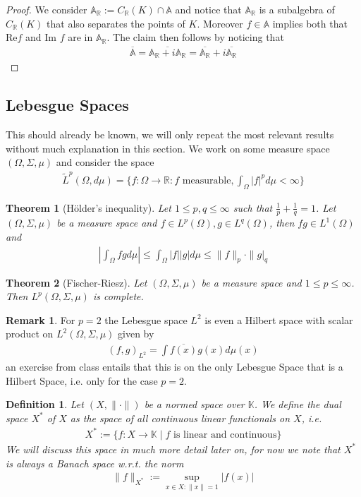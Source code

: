 \documentclass[11pt,a4paper]{article}
\newtheorem{thm}{Theorem}[section]
\newtheorem{defn}{Definition}[section]
\theoremstyle{definition}
\newtheorem{rem}{Remark}[section]
\begin{document}
\begin{proof}
We consider $\mathbb{A}_\mathbb{R}:= C_\mathbb{R}(K) \cap \mathbb{A}$ and notice that $\mathbb{A}_\mathbb{R}$ is a subalgebra of $C_\mathbb{R}(K)$ that also separates the points of $K$. Moreover $f \in \mathbb{A}$ implies both that Re$f$ and  Im $f$ are in $\mathbb{A}_\mathbb{R}$. The claim then follows by noticing that
\begin{align*}
\overline{\mathbb{A}}= \overline{\mathbb{A}_\mathbb{R} + i \mathbb{A}_\mathbb{R}} = \overline{\mathbb{A}_\mathbb{R}}+ i \overline{\mathbb{A}_\mathbb{R}}
\end{align*}
\end{proof}
\newpage 
\subsection{Lebesgue Spaces}
This should already be known, we will only repeat the most relevant results without much explanation in this section. We work on some measure space $(\Omega, \Sigma, \mu)$ and consider the space 
\begin{align*}
\tilde{L}^p( \Omega, d \mu)= \lbrace f: \Omega \to \mathbb{R} : f \text{ measurable}, \int_\Omega |f|^p d \mu < \infty \rbrace 
\end{align*}
\begin{thm}[Hölder's inequality] Let $1 \leq p,q \leq \infty$ such that $\frac{1}{p} + \frac{1}{q}=1$. Let $( \Omega, \Sigma, \mu)$ be a measure space and $f \in L^p( \Omega), g \in L^q( \Omega)$, then $fg \in L^1(\Omega)$ and 
\begin{align*}
\left| \int_\Omega fg d \mu \right| \leq \int_\Omega |f| |g| d \mu \leq \|f\|_p \cdot \|g|_q
\end{align*}
\end{thm}
\begin{thm}[Fischer-Riesz] Let $( \Omega, \Sigma, \mu)$ be a measure space and $1 \leq p \leq \infty$. Then $L^p( \Omega, \Sigma, \mu)$ is complete. 
\end{thm}
\begin{rem} For $p=2$ the Lebesgue space $L^2$ is even a Hilbert space with scalar product on $L^2( \Omega, \Sigma, \mu)$ given by 
\begin{align*}
(f,g)_{L^2} = \int \overline{f(x)} g(x) d\mu(x) 
\end{align*}
an exercise from class entails that this is on the only Lebesgue Space that is a Hilbert Space, i.e. only for the case $p=2$. 
\end{rem}
\begin{defn} Let $(X, \| \cdot \|)$ be a normed space over $\mathbb{K}$. We define the dual space $X^*$ of $X$ as the space of all continuous linear functionals on $X$, i.e. 
\begin{align*}
X^*:= \lbrace f: X \to \mathbb{K} \mid f \text{ is linear and continuous} \rbrace
\end{align*}
We will discuss this space in much more detail later on, for now we note that $X^*$ is always a Banach space w.r.t. the norm 
\begin{align*}
\|f\|_{X^*} := \sup_{x \in X: \|x\| = 1 } |f(x)| 
\end{align*}
\end{defn}
\end{document}
